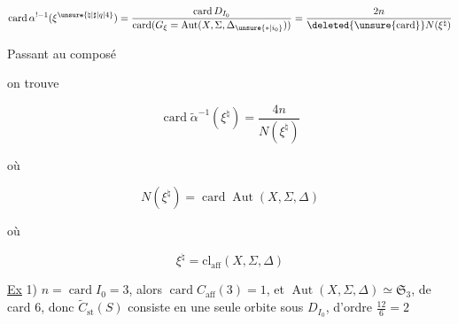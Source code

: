 
\[
\operatorname{card}\alpha^{!-1}(\xi^{\unsure{\natural|\sharp|q|4}})=
\frac{\operatorname{card}D_{I_0}}{\operatorname{card}(G_\xi=\operatorname{Aut}(X,\Sigma,\Delta_{\unsure{*|i_0}}))}
=\frac{2n}{\deleted{\unsure{\mathrm{card}}}N(\xi^\natural)}
\]

Passant au composé


on trouve

\[
\operatorname{card}\widetilde\alpha^{-1}(\xi^\natural)=\frac{4n}{N(\xi^\natural)}
\]

où

\[
N(\xi^\natural)=\operatorname{card}\operatorname{Aut}(X,\Sigma,\Delta)
\]

où

\[
\xi^\natural=\mathrm{cl}_{\mathrm{aff}}(X,\Sigma,\Delta)
\]

\uline{Ex} 1) $n=\operatorname{card}I_0=3$, alors $\operatorname{card}C_{\mathrm{aff}}(3)=1$, et $\operatorname{Aut}(X,\Sigma,\Delta)\simeq\mathfrak S_3$, de card $6$, donc $\widetilde C_{\mathrm{st}}(S)$ consiste en une seule orbite sous $D_{I_0}$, d'ordre $\frac{12}{6}=2$
